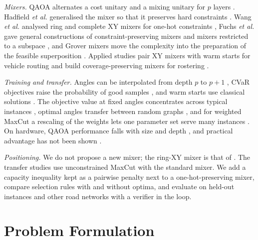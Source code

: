 \documentclass[conference]{IEEEtran}
\begin{document}
\textit{Mixers.} QAOA alternates a cost unitary and a mixing unitary for $p$ layers \cite{Farhi2014,Blekos2024}. Hadfield \textit{et al.} generalised the mixer so that it preserves hard constraints \cite{Hadfield2019}. Wang \textit{et al.} analysed ring and complete XY mixers for one-hot constraints \cite{WangZ2020}, Fuchs \textit{et al.} gave general constructions of constraint-preserving mixers \cite{Fuchs2022} and mixers restricted to a subspace \cite{Fuchs2024}, and Grover mixers move the complexity into the preparation of the feasible superposition \cite{Bartschi2020}. Applied studies pair XY mixers with warm starts for vehicle routing \cite{doCarmo2025} and build coverage-preserving mixers for rostering \cite{Gupta2026}.

\textit{Training and transfer.} Angles can be interpolated from depth $p$ to $p{+}1$ \cite{Zhou2020}, CVaR objectives raise the probability of good samples \cite{Barkoutsos2020}, and warm starts use classical solutions \cite{Egger2021}. The objective value at fixed angles concentrates across typical instances \cite{Brandao2018}, optimal angles transfer between random graphs \cite{Galda2021}, and for weighted MaxCut a rescaling of the weights lets one parameter set serve many instances \cite{Shaydulin2023}. On hardware, QAOA performance falls with size and depth \cite{Harrigan2021}, and practical advantage has not been shown \cite{Abbas2024}.

\textit{Positioning.} We do not propose a new mixer; the ring-XY mixer is that of \cite{WangZ2020}. The transfer studies \cite{Brandao2018,Galda2021,Shaydulin2023} use unconstrained MaxCut with the standard mixer. We add a capacity inequality kept as a pairwise penalty next to a one-hot-preserving mixer, compare selection rules with and without optima, and evaluate on held-out instances and other road networks with a verifier in the loop.

\section{Problem Formulation}
\end{document}
